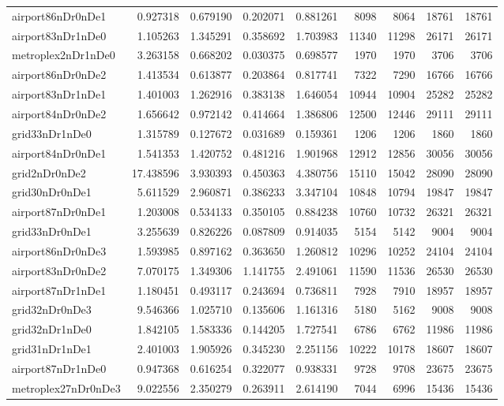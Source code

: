 \begin{longtable}{|l|r|r|r|r|r|r|r|r|}
airport86nDr0nDe1 & 0.927318 & 0.679190 & 0.202071 & 0.881261 & 8098 & 8064 & 18761 & 18761 \\
airport83nDr1nDe0 & 1.105263 & 1.345291 & 0.358692 & 1.703983 & 11340 & 11298 & 26171 & 26171 \\
metroplex2nDr1nDe0 & 3.263158 & 0.668202 & 0.030375 & 0.698577 & 1970 & 1970 & 3706 & 3706 \\
airport86nDr0nDe2 & 1.413534 & 0.613877 & 0.203864 & 0.817741 & 7322 & 7290 & 16766 & 16766 \\
airport83nDr1nDe1 & 1.401003 & 1.262916 & 0.383138 & 1.646054 & 10944 & 10904 & 25282 & 25282 \\
airport84nDr0nDe2 & 1.656642 & 0.972142 & 0.414664 & 1.386806 & 12500 & 12446 & 29111 & 29111 \\
grid33nDr1nDe0 & 1.315789 & 0.127672 & 0.031689 & 0.159361 & 1206 & 1206 & 1860 & 1860 \\
airport84nDr0nDe1 & 1.541353 & 1.420752 & 0.481216 & 1.901968 & 12912 & 12856 & 30056 & 30056 \\
grid2nDr0nDe2 & 17.438596 & 3.930393 & 0.450363 & 4.380756 & 15110 & 15042 & 28090 & 28090 \\
grid30nDr0nDe1 & 5.611529 & 2.960871 & 0.386233 & 3.347104 & 10848 & 10794 & 19847 & 19847 \\
airport87nDr0nDe1 & 1.203008 & 0.534133 & 0.350105 & 0.884238 & 10760 & 10732 & 26321 & 26321 \\
grid33nDr0nDe1 & 3.255639 & 0.826226 & 0.087809 & 0.914035 & 5154 & 5142 & 9004 & 9004 \\
airport86nDr0nDe3 & 1.593985 & 0.897162 & 0.363650 & 1.260812 & 10296 & 10252 & 24104 & 24104 \\
airport83nDr0nDe2 & 7.070175 & 1.349306 & 1.141755 & 2.491061 & 11590 & 11536 & 26530 & 26530 \\
airport87nDr1nDe1 & 1.180451 & 0.493117 & 0.243694 & 0.736811 & 7928 & 7910 & 18957 & 18957 \\
grid32nDr0nDe3 & 9.546366 & 1.025710 & 0.135606 & 1.161316 & 5180 & 5162 & 9008 & 9008 \\
grid32nDr1nDe0 & 1.842105 & 1.583336 & 0.144205 & 1.727541 & 6786 & 6762 & 11986 & 11986 \\
grid31nDr1nDe1 & 2.401003 & 1.905926 & 0.345230 & 2.251156 & 10222 & 10178 & 18607 & 18607 \\
airport87nDr1nDe0 & 0.947368 & 0.616254 & 0.322077 & 0.938331 & 9728 & 9708 & 23675 & 23675 \\
metroplex27nDr0nDe3 & 9.022556 & 2.350279 & 0.263911 & 2.614190 & 7044 & 6996 & 15436 & 15436 \\

\end{longtable}
